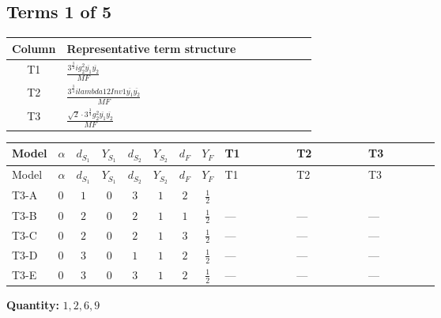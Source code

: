 \documentclass[8pt]{article}
\begin{document}
\begin{landscape}
\subsection*{Terms 1 of 5}
\begin{center}
\begin{tabular}{@{}c >{\raggedright\arraybackslash}p{0.82\linewidth}@{}}
\toprule
Column & Representative term structure \\
\midrule
T1 & \(\displaystyle \frac{3^{\frac{3}{4}} i g_{2}^{2} \overline{y_{1}} \overline{y_{2}}}{MF}\) \\
\midrule
T2 & \(\displaystyle \frac{3^{\frac{3}{4}} i lambda12Inv1 \overline{y_{1}} \overline{y_{2}}}{MF}\) \\
\midrule
T3 & \(\displaystyle \frac{\sqrt{2} \cdot 3^{\frac{3}{4}} g_{2}^{2} \overline{y_{1}} \overline{y_{2}}}{MF}\) \\
\midrule
\bottomrule
\end{tabular}
\end{center}
\smallskip
\tiny
\begin{longtable}{@{}llcccccc >{\raggedright\arraybackslash}p{0.21\linewidth} >{\raggedright\arraybackslash}p{0.21\linewidth} >{\raggedright\arraybackslash}p{0.21\linewidth}@{}}
\toprule
Model & $\alpha$ & $d_{S_1}$ & $Y_{S_1}$ & $d_{S_2}$ & $Y_{S_2}$ & $d_F$ & $Y_F$ & T1 & T2 & T3 \\
\midrule
\endfirsthead
\toprule
Model & $\alpha$ & $d_{S_1}$ & $Y_{S_1}$ & $d_{S_2}$ & $Y_{S_2}$ & $d_F$ & $Y_F$ & T1 & T2 & T3 \\
\midrule
\endhead
T3-A & $0$ & $1$ & $0$ & $3$ & $1$ & $2$ & $\frac{1}{2}$ & \scriptsize\adjustbox{max width=\linewidth}{$\begin{gathered} - \frac{25 \cdot 3^{\frac{3}{4}} i g_{2}^{2} \overline{y_{1}} \overline{y_{2}}}{24 MF}\end{gathered}$} & \scriptsize\adjustbox{max width=\linewidth}{$\begin{gathered} - \frac{3^{\frac{3}{4}} i lambda12Inv1 \overline{y_{1}} \overline{y_{2}}}{6 MF}\end{gathered}$} & \scriptsize\adjustbox{max width=\linewidth}{$\begin{gathered} - \frac{\sqrt{2} \cdot 3^{\frac{3}{4}} g_{2}^{2} \overline{y_{1}} \overline{y_{2}}}{6 MF}\end{gathered}$} \\
\midrule
T3-B & $0$ & $2$ & $0$ & $2$ & $1$ & $1$ & $\frac{1}{2}$ & --- & --- & --- \\
\midrule
T3-C & $0$ & $2$ & $0$ & $2$ & $1$ & $3$ & $\frac{1}{2}$ & --- & --- & --- \\
\midrule
T3-D & $0$ & $3$ & $0$ & $1$ & $1$ & $2$ & $\frac{1}{2}$ & --- & --- & --- \\
\midrule
T3-E & $0$ & $3$ & $0$ & $3$ & $1$ & $2$ & $\frac{1}{2}$ & --- & --- & --- \\
\midrule
\bottomrule
\end{longtable}
\clearpage
\noindent\textbf{Quantity: }$\mathrm{1,2,6,9}$\par\smallskip

\end{landscape}
\end{document}

